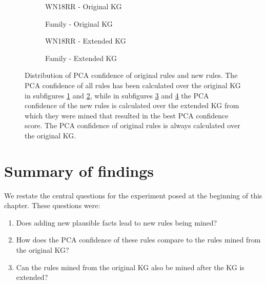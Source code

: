 \begin{figure}[htbp]
\centering
\begin{subfigure}{.49\textwidth}
  \centering
    
    \caption{WN18RR - Original KG}
  \label{fig:PCA_rule_dist_new_original_wn18rr_sub}
\end{subfigure}
\begin{subfigure}{.49\textwidth}
  \centering
    
    \caption{Family - Original KG}
  \label{fig:PCA_rule_dist_new_original_family_sub}
\end{subfigure}
\begin{subfigure}{.49\textwidth}
  \centering
    
    \caption{WN18RR - Extended KG}
  \label{fig:_PCA_rule_dist_new_original_wn18rr_sub}
\end{subfigure}%
\begin{subfigure}{.49\textwidth}
  \centering
    
    \caption{Family - Extended KG}
  \label{fig:_PCA_rule_dist_new_original_family_sub}
\end{subfigure}
\caption[PCA conf. dist. of new and original rules.]{Distribution of PCA confidence of original rules and new rules. The PCA confidence of all rules has been calculated over the original KG in subfigures \ref{fig:PCA_rule_dist_new_original_wn18rr_sub} and \ref{fig:PCA_rule_dist_new_original_family_sub}, while in subfigures \ref{fig:_PCA_rule_dist_new_original_wn18rr_sub} and \ref{fig:_PCA_rule_dist_new_original_family_sub} the PCA confidence of the new rules is calculated over the extended KG from which they were mined that resulted in the best PCA confidence score. The PCA confidence of original rules is always calculated over the original KG.}
\label{fig:PCA_rule_dist_new_original}
\end{figure}


\section{Summary of findings}
\label{results_summary}
We restate the central questions for the experiment posed at the beginning of this chapter. These questions were:
\begin{enumerate}
    \item Does adding new plausible facts lead to new rules being mined? 
    \item How does the PCA confidence of these rules compare to the rules mined from the original KG?
    \item Can the rules mined from the original KG also be mined after the KG is extended?
\end{enumerate}

